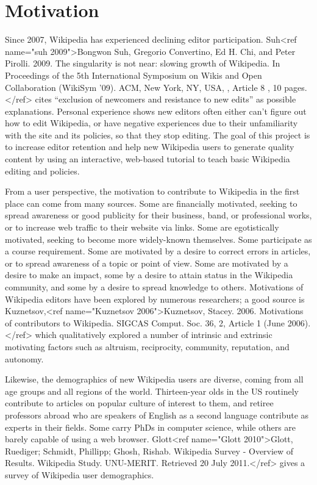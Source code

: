 \documentclass{acm_proc_article-sp}
\begin{document}
\section{Motivation}
Since 2007, Wikipedia has experienced declining editor participation. Suh<ref name="suh 2009">Bongwon Suh, Gregorio Convertino, Ed H. Chi, and Peter Pirolli. 2009. The singularity is not near: slowing growth of Wikipedia. In Proceedings of the 5th International Symposium on Wikis and Open Collaboration (WikiSym '09). ACM, New York, NY, USA, , Article 8 , 10 pages.</ref> cites ``exclusion of newcomers and resistance to new edits'' as possible explanations. Personal experience shows new editors often either can't figure out how to edit Wikipedia, or have negative experiences due to their unfamiliarity with the site and its policies, so that they stop editing. The goal of this project is to increase editor retention and help new Wikipedia users to generate quality content by using an interactive, web-based tutorial to teach basic Wikipedia editing and policies.

From a user perspective, the motivation to contribute to Wikipedia in the first place can come from many sources. Some are financially motivated, seeking to spread awareness or good publicity for their business, band, or professional works, or to increase web traffic to their website via links. Some are egotistically motivated, seeking to become more widely-known themselves. Some participate as a course requirement. Some are motivated by a desire to correct errors in articles, or to spread awareness of a topic or point of view. Some are motivated by a desire to make an impact, some by a desire to attain status in the Wikipedia community, and some by a desire to spread knowledge to others. Motivations of Wikipedia editors have been explored by numerous researchers; a good source is Kuznetsov,<ref name="Kuznetsov 2006">Kuznetsov, Stacey. 2006. Motivations of contributors to Wikipedia. SIGCAS Comput. Soc. 36, 2, Article 1 (June 2006).</ref> which qualitatively explored a number of intrinsic and extrinsic motivating factors such as altruism, reciprocity, community, reputation, and autonomy.

Likewise, the demographics of new Wikipedia users are diverse, coming from all age groups and all regions of the world. Thirteen-year olds in the US routinely contribute to articles on popular culture of interest to them, and retiree professors abroad who are speakers of English as a second language contribute as experts in their fields. Some carry PhDs in computer science, while others are barely capable of using a web browser. Glott<ref name="Glott 2010">Glott, Ruediger; Schmidt, Phillipp; Ghosh, Rishab. Wikipedia Survey - Overview of Results. Wikipedia Study. UNU-MERIT. Retrieved 20 July 2011.</ref> gives a survey of Wikipedia user demographics.
\end{document}

